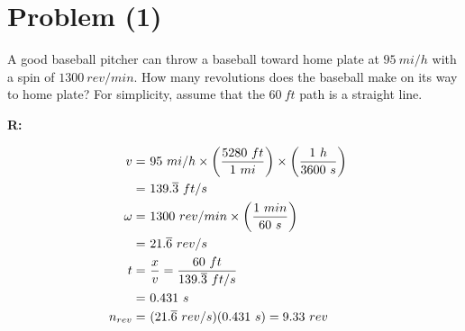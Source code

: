 \section{Problem (1)}
	A good baseball pitcher can throw a baseball toward home plate at $95 \ mi/h$ with a spin of $1300 \ rev/min$. How many revolutions does the baseball make on its way to home plate? For simplicity, assume that the $60 \ ft$ path is a straight line.

	\textbf{R:}

	\begin{align}
		v = \ &95 \ mi/h
		\times \left( \frac{5280 \ ft}{1 \ mi} \right)
		\times \left( \frac{1 \ h}{3600 \ s} \right)
		& \notag \\
		= \ &139.\overline{3} \ ft/s& \notag \\
		\omega = \ &1300 \ rev/min
		\times \left( \frac{1 \ min}{60 \ s} \right)
		& \notag \\
		= \ &21.\overline{6} \ rev/s& \notag \\
		t = \ &\frac{x}{v} = \frac{60 \ ft}{139.\overline{3} \ ft/s}& \notag \\
		= \ &0.431 \ s& \notag \\
		n_{rev} = \ &(21.\overline{6} \ rev/s)(0.431 \ s) = 9.33 \ rev&
	\end{align}
